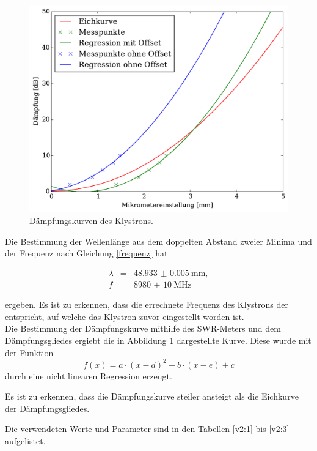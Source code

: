 \begin{figure}
	\includegraphics[width = 14cm]{pic/Daempfung.pdf}
	\caption[]{Dämpfungskurven des Klystrons.}
	\label{daempf}
\end{figure}

Die Bestimmung der Wellenlänge aus dem doppelten Abstand zweier Minima und der Frequenz nach Gleichung \eqref{frequenz} hat

\begin{eqnarray}
	\lambda &=& \SI{48.933(5)}{\milli\meter},\\
	f &=& \SI{8980(10)}{\mega\hertz}
\end{eqnarray}

ergeben.
Es ist zu erkennen, dass die errechnete Frequenz des Klystrons der entspricht, auf welche das Klystron zuvor eingestellt worden ist.\\

Die Bestimmung der Dämpfungskurve mithilfe des SWR-Meters und dem Dämpfungsgliedes ergiebt die in Abbildung \ref{daempf} dargestellte Kurve.
Diese wurde mit der Funktion
\begin{equation}
	f(x)=a \cdot (x-d)^2 + b \cdot (x-e) + c
\end{equation}
 durch eine nicht linearen Regression erzeugt.

Es ist zu erkennen, dass die Dämpfungskurve steiler ansteigt als die Eichkurve der Dämpfungsgliedes.

Die verwendeten Werte und Parameter sind in den Tabellen \ref{v2:1} bis \ref{v2:3} aufgelistet.


